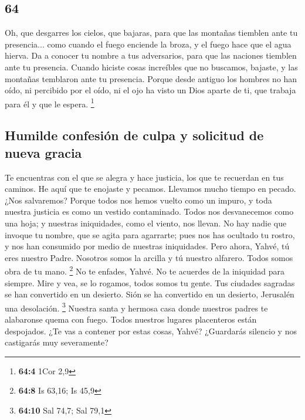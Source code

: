 \begin{paracol}{2}
\hypertarget{section-126}{%
\section{64}\label{section-126}}

 Oh, que desgarres los cielos, que bajaras, para que las
montañas tiemblen ante tu presencia...  como cuando el
fuego enciende la broza, y el fuego hace que el agua hierva. Da a
conocer tu nombre a tus adversarios, para que las naciones tiemblen ante
tu presencia.  Cuando hiciste cosas increíbles que no
buscamos, bajaste, y las montañas temblaron ante tu presencia.
 Porque desde antiguo los hombres no han oído, ni
percibido por el oído, ni el ojo ha visto un Dios aparte de ti, que
trabaja para él y que le espera. \footnote{\textbf{64:4} 1Cor 2,9}

\hypertarget{humilde-confesiuxf3n-de-culpa-y-solicitud-de-nueva-gracia}{%
\subsection{Humilde confesión de culpa y solicitud de nueva
gracia}\label{humilde-confesiuxf3n-de-culpa-y-solicitud-de-nueva-gracia}}

 Te encuentras con el que se alegra y hace justicia, los
que te recuerdan en tus caminos. He aquí que te enojaste y pecamos.
Llevamos mucho tiempo en pecado. ¿Nos salvaremos?  Porque
todos nos hemos vuelto como un impuro, y toda nuestra justicia es como
un vestido contaminado. Todos nos desvanecemos como una hoja; y nuestras
iniquidades, como el viento, nos llevan.  No hay nadie que
invoque tu nombre, que se agita para agarrarte; pues nos has ocultado tu
rostro, y nos han consumido por medio de nuestras iniquidades.
 Pero ahora, Yahvé, tú eres nuestro Padre. Nosotros somos
la arcilla y tú nuestro alfarero. Todos somos obra de tu mano.
\footnote{\textbf{64:8} Is 63,16; Is 45,9}  No te enfades,
Yahvé. No te acuerdes de la iniquidad para siempre. Mire y vea, se lo
rogamos, todos somos tu gente.  Tus ciudades sagradas se
han convertido en un desierto. Sión se ha convertido en un desierto,
Jerusalén una desolación. \footnote{\textbf{64:10} Sal 74,7; Sal 79,1}
 Nuestra santa y hermosa casa donde nuestros padres te
alabaronse quema con fuego. Todos nuestros lugares placenteros están
despojados.  ¿Te vas a contener por estas cosas, Yahvé?
¿Guardarás silencio y nos castigarás muy severamente?


\end{paracol}
